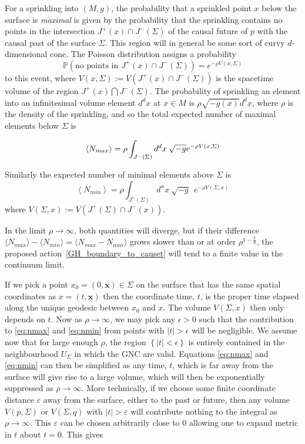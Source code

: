 \documentclass[12pt]{article}
\newcommand{\be}{\begin{equation}}
\newcommand{\ee}{\end{equation}}
\begin{document}
For a sprinkling into $(M,g)$, the probability that a sprinkled point $x$ below the surface is \emph{maximal} is given by the probability that the sprinkling contains no points in the intersection $J^{+}(x)\cap J^{-}(\Sigma)$ of the causal future of $p$ with the causal past of the surface $\Sigma$. This region will in general be some sort of curvy $d$-dimensional cone. The Poisson distribution assigns a probability
\be\label{Poisson}
\mathbb P\left(\text{no points in }J^{+}(x)\cap J^{-}(\Sigma)\right)=e^{-\rho V(x,\Sigma)}
\ee
to this event, where $V(x,\Sigma):=V(J^{+}(x)\cap J^{-}(\Sigma))$ is the spacetime volume of the region $J^{+}(x)\bigcap J^{-}(\Sigma)$. The probability of sprinkling an element into an infinitesimal volume element $d^dx$ at $x\in M$ is $\rho\sqrt{-g(x)}d^dx$, where $\rho$ is the density of the sprinkling, and so the total expected number of maximal elements below $\Sigma$ is

\be\label{eq:nmax}
\left\langle N_{max}\right\rangle =\rho\int_{J^{-}(\Sigma)}d^{d}x\:\sqrt{-g}\\ e^{-\rho V(x,\Sigma)}
\ee

Similarly the expected number of minimal elements above $\Sigma$ is
\be\label{eq:nmin}
\left\langle N_{min}\right\rangle =\rho\int_{J^{+}(\Sigma)}d^{n}x\:\sqrt{-g}\ \ e^{-\rho V(\Sigma,x)}
\ee
where $V(\Sigma,x):=V(J^{+}(\Sigma)\cap J^{-}(x))$.

In the limit $\rho\rightarrow\infty$, both quantities will diverge, but if their difference $\langle N_{max}\rangle - \langle N_{min}\rangle = \langle N_{max} - N_{min}\rangle$ grows slower than or at order $\rho^{1-\frac2d}$, the proposed action~\eqref{GH_boundary_to_causet} will tend to a finite value in the continuum limit.

If we pick a point $x_0=(0,\mathbf{x})\in \Sigma$ on the surface that has the same spatial coordinates as $x=(t,\mathbf{x})$ then the coordinate time, $t$, is the proper time elapsed along the unique geodesic between $x_0$ and $x$. The volume $V(\Sigma,x)$ then only depends on $t$. Now as $\rho\rightarrow\infty$, we may pick any $\epsilon>0$ such that the contribution to \eqref{eq:nmax} and \eqref{eq:nmin} from points with $|t|>\epsilon$ will be negligible. We assume now that for large enough $\rho$, the region $\left\{|t|<\epsilon\right\}$ is entirely contained in the neighbourhood $U_\Sigma$ in which the GNC are valid.
Equations \eqref{eq:nmax} and \eqref{eq:nmin} can then be simplified as any time, $t$, which is far away from the surface will give rise to a large volume, which will then be exponentially suppressed as $\rho \rightarrow \infty$. More technically, if we choose some finite coordinate distance $\varepsilon$ away from the surface, either to the past or future, then any volume $V(p,\Sigma)$ or $V(\Sigma,q)$ with $|t|>\varepsilon$ will contribute nothing to the integral as $\rho \rightarrow \infty$. This $\varepsilon$ can be chosen arbitrarily close to $0$ allowing one to expand metric in $t$ about $t=0$. This gives
\end{document}

